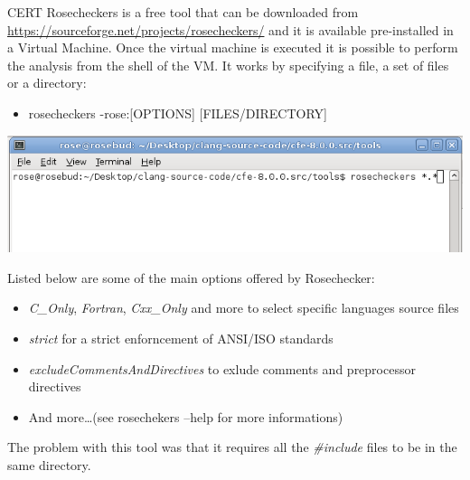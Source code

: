 CERT Rosecheckers is a free tool that can be downloaded from \url{https://sourceforge.net/projects/rosecheckers/} and it is available pre-installed in a Virtual Machine.\newline
Once the virtual machine is executed it is possible to perform the analysis from the shell of the VM. It works by specifying a file, a set of files or a directory:

\begin{itemize}
	\item rosecheckers -rose:[OPTIONS] [FILES/DIRECTORY]
\end{itemize}

\begin{minipage}{\linewidth}
\includegraphics[width=\textwidth]{img/rosechecker-commandline.png}
\end{minipage}
\pagebreak

Listed below are some of the main options offered by Rosechecker:

\begin{itemize}
	\item \textsl{C\_Only}, \textsl{Fortran}, \textsl{Cxx\_Only} and more to select specific languages source files
	\item \textsl{strict} for a strict enforncement of ANSI/ISO standards
	\item \textsl{excludeCommentsAndDirectives} to exlude comments and preprocessor directives
	\item And more\dots (see rosechekers --help for more informations)
\end{itemize}

The problem with this tool was that it requires all the \textsl{\#include} files to be in the same directory.\newline\newline

